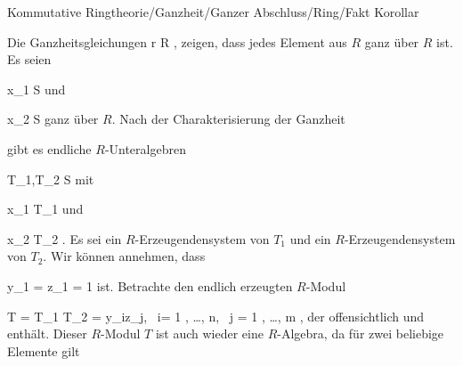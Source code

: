 {Kommutative Ringtheorie/Ganzheit/Ganzer Abschluss/Ring/Fakt}
{Korollar}
{}
{



\faktsituation {}
\faktzusatz {}
\faktzusatz {}





}
{





Die Ganzheitsgleichungen  { r \in R   }{,} zeigen, dass jedes Element aus $R$ ganz über $R$ ist. Es seien

\mavergleichskette
{\vergleichskette
{ x_1
}
{ \in }{ S
}
{  }{
}
{    }{
}
{   }{
}
}
{}{}{}
und

\mavergleichskette
{\vergleichskette
{ x_2
}
{ \in }{ S
}
{  }{
}
{    }{
}
{   }{
}
}
{}{}{}
ganz über $R$. Nach
der
Charakterisierung der Ganzheit

gibt es endliche $R$-Unteralgebren

\mavergleichskette
{\vergleichskette
{ T_1,T_2
}
{ \subseteq }{ S
}
{  }{
}
{    }{
}
{   }{
}
}
{}{}{}
mit

\mavergleichskette
{\vergleichskette
{ x_1
}
{ \in }{ T_1
}
{  }{
}
{    }{
}
{   }{
}
}
{}{}{}
und

\mavergleichskette
{\vergleichskette
{ x_2
}
{ \in }{ T_2
}
{  }{
}
{    }{
}
{   }{
}
}
{}{}{.}
Es sei
 ein $R$-Erzeugendensystem von $T_1$ und
 ein $R$-Erzeugendensystem von $T_2$. Wir können annehmen, dass

\mavergleichskette
{\vergleichskette
{ y_1
}
{ = }{ z_1
}
{ = }{ 1
}
{    }{
}
{   }{
}
}
{}{}{}
ist. Betrachte den endlich erzeugten $R$-Modul

\mavergleichskettedisp
{\vergleichskette
{ T
}
{ =} { T_1 \cdot T_2
}
{ =} { \langle y_iz_j, \, i= 1 , \ldots ,  n, \, j = 1 , \ldots , m \rangle
}
{ } {
}
{ } {
}
}
{}{}{,}
der offensichtlich
 und
 {} {}
enthält. Dieser $R$-Modul $T$ ist auch wieder eine $R$-Algebra, da für zwei beliebige Elemente gilt

}
